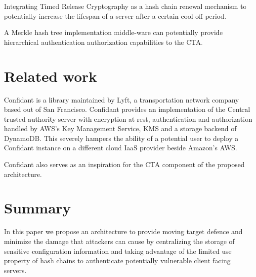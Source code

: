\documentclass{sig-alternate-05-2015}
\begin{document}
Integrating Timed Release Cryptography \cite{chalkias_timed_2006} as a hash chain renewal mechanism to potentially increase the lifespan of a server after a certain cool off period.

A Merkle hash tree implementation middle-ware can potentially provide hierarchical authentication authorization \cite{yi_cloud_2012} capabilities to the CTA.

\section*{Related work}

Confidant \cite{lyft_confidant:_2015} is a library maintained by Lyft, a transportation network company based out of San Francisco. Confidant provides an implementation of the Central trusted authority server with encryption at rest, authentication and authorization handled by AWS's Key Management Service, KMS and a storage backend of DynamoDB. This severely hampers the ability of a potential user to deploy a Confidant instance on a different cloud IaaS provider beside Amazon's AWS. 

Confidant also serves as an inspiration for the CTA component of the proposed architecture.

\section*{Summary}

In this paper we propose an architecture to provide moving target defence and minimize the damage that attackers can cause by centralizing the storage of sensitive configuration information and taking advantage of the limited use property of hash chains to authenticate potentially vulnerable client facing servers. 





%
%
\end{document}
